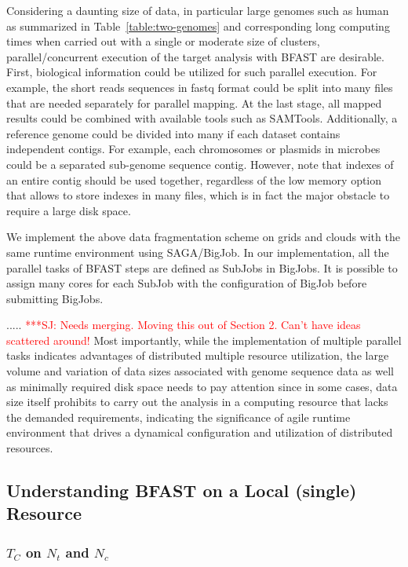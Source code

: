 \documentclass[12pt]{article}
\newcommand{\jhanote}[1]{ {\textcolor{red}     {***SJ: #1}}}
\newcommand{\jhanote}[1]{}
\begin{document}
Considering a daunting size of data, in particular large genomes such as human as summarized in Table~\ref{table:two-genomes} and corresponding long computing times when carried out with a single or moderate size of clusters, parallel/concurrent execution of the target analysis with BFAST are desirable.  First, biological information could be utilized for such parallel execution. For example, the short reads sequences in fastq format could be split into many files that are needed separately for parallel mapping.  At the last stage, all mapped results could be combined with available tools such as SAMTools\cite{samtools}.   Additionally, a reference genome could be divided into many if each dataset contains independent contigs.  For example, each chromosomes or plasmids in microbes could be a separated sub-genome sequence contig.  However, note that indexes of an entire contig should be used together, regardless of the low memory option that allows to store indexes in many files, which is in fact the major obstacle to require a large disk space.

We implement the above data fragmentation scheme on grids and clouds with the same runtime environment using SAGA/BigJob\cite{saga-royalsoc,saga-ccgrid10, ecmls10}.  In our implementation, all the parallel tasks of BFAST steps are defined as SubJobs in BigJobs.  It is possible to assign many cores for each SubJob with the configuration of BigJob before submitting BigJobs. 
  
..... \jhanote{Needs merging. Moving this out of Section 2. Can't have ideas scattered around!} Most importantly, while the implementation of multiple parallel tasks indicates advantages of distributed multiple resource utilization, the large volume and variation of data sizes associated with genome sequence data as well as minimally required disk space needs to pay attention since in some cases, data size itself prohibits to carry out the analysis in a computing resource that lacks the demanded requirements, indicating the significance of agile runtime environment that drives a dynamical configuration and utilization of distributed resources.

\subsection{Understanding BFAST on a Local (single) Resource}

\subsubsection{$T_{C}$ on $N_t$ and $N_c$}
\end{document}
